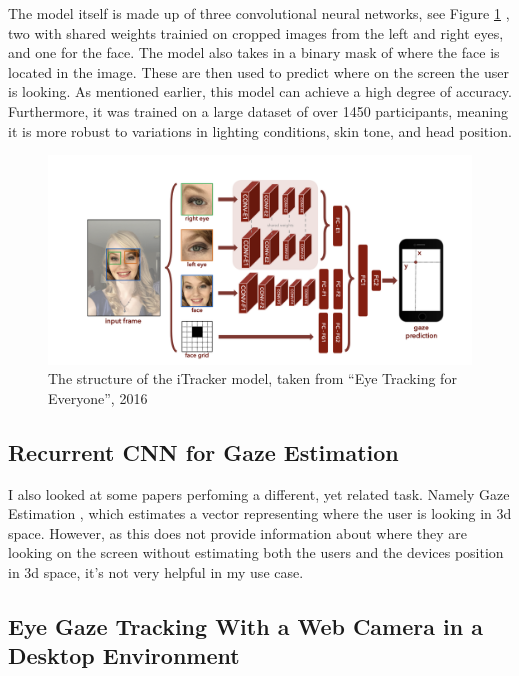 \documentclass[twocolumn]{report}
\begin{document}
The model itself is made up of three convolutional neural networks, see Figure \ref{fig:itracker-model} , two with shared weights trainied on cropped images from the left and right eyes, and one for the face. The model also takes in a binary mask of where the face is located in the image. These are then used to predict where on the screen the user is looking. As mentioned earlier, this model can achieve a high degree of accuracy. Furthermore, it was trained on a large dataset of over 1450 participants, meaning it is more robust to variations in lighting conditions, skin tone, and head position. 

\begin{figure}[h]
    \begin{center}
        \includegraphics[scale=0.3]{../assets/iTracker-network.png}
    \end{center}
    \caption{The structure of the iTracker model, taken from ``Eye Tracking for Everyone'', 2016 \cite{krafka2016eye}}
    \label{fig:itracker-model}
\end{figure}

\subsection{Recurrent CNN for Gaze Estimation}

I also looked at some papers perfoming a different, yet related task. Namely Gaze Estimation \cite{palmero2018recurrent}, which estimates a vector representing where the user is looking in 3d space. However, as this does not provide information about where they are looking on the screen without estimating both the users and the devices position in 3d space, it's not very helpful in my use case. 

\subsection{Eye Gaze Tracking With a Web Camera in a Desktop Environment} 
\end{document}
